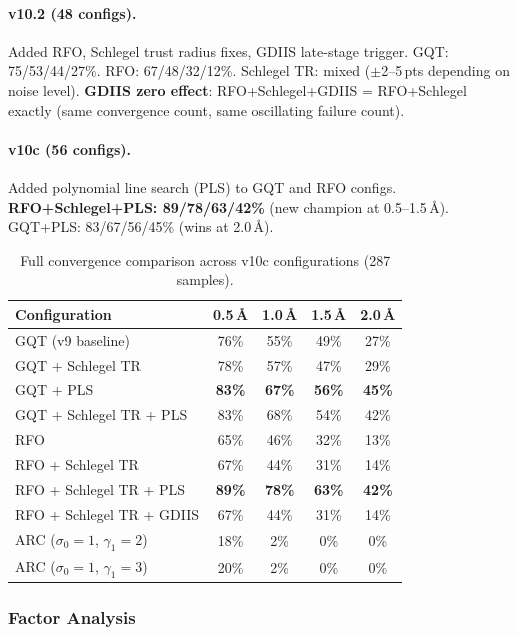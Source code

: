\documentclass[11pt,a4paper]{article}
\theoremstyle{definition}
\begin{document}
\paragraph{v10.2 (48 configs).}
Added RFO, Schlegel trust radius fixes, GDIIS late-stage trigger.
GQT: 75/53/44/27\%.
RFO: 67/48/32/12\%.
Schlegel TR: mixed ($\pm$2--5\,pts depending on noise level).
\textbf{GDIIS zero effect}: RFO+Schlegel+GDIIS = RFO+Schlegel exactly
(same convergence count, same oscillating failure count).

\paragraph{v10c (56 configs).}
Added polynomial line search (PLS) to GQT and RFO configs.
\textbf{RFO+Schlegel+PLS: 89/78/63/42\%} (new champion at 0.5--1.5\,\AA).
GQT+PLS: 83/67/56/45\% (wins at 2.0\,\AA).

\begin{table}[h]
\centering
\caption{Full convergence comparison across v10c configurations (287 samples).}
\label{tab:v10c-full}
\begin{tabular}{lcccc}
\toprule
Configuration & 0.5\,\AA & 1.0\,\AA & 1.5\,\AA & 2.0\,\AA \\
\midrule
GQT (v9 baseline) & 76\% & 55\% & 49\% & 27\% \\
GQT + Schlegel TR & 78\% & 57\% & 47\% & 29\% \\
GQT + PLS & \textbf{83\%} & \textbf{67\%} & \textbf{56\%} & \textbf{45\%} \\
GQT + Schlegel TR + PLS & 83\% & 68\% & 54\% & 42\% \\ %
\midrule
RFO & 65\% & 46\% & 32\% & 13\% \\
RFO + Schlegel TR & 67\% & 44\% & 31\% & 14\% \\
RFO + Schlegel TR + PLS & \textbf{89\%} & \textbf{78\%} & \textbf{63\%} & \textbf{42\%} \\
RFO + Schlegel TR + GDIIS & 67\% & 44\% & 31\% & 14\% \\
\midrule
ARC ($\sigma_0=1$, $\gamma_1=2$) & 18\% & 2\% & 0\% & 0\% \\
ARC ($\sigma_0=1$, $\gamma_1=3$) & 20\% & 2\% & 0\% & 0\% \\
\bottomrule
\end{tabular}
\end{table}

\subsubsection{Factor Analysis}
\end{document}
